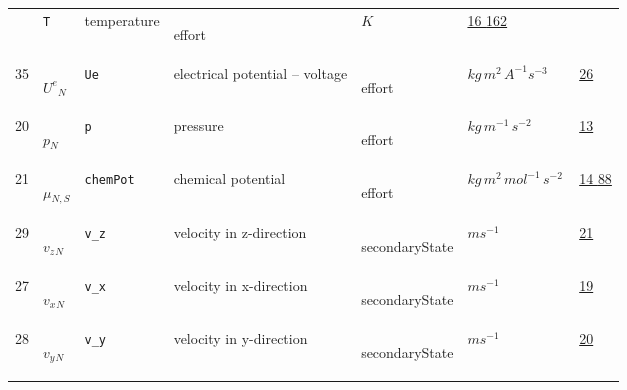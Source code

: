 \begin{longtable}{|p{1cm}|p{2.5cm}|p{4.5cm}|p{8cm}|p{3.0cm}|p{3cm}|p{1cm}|}
             & \verb|T|
             & temperature
             & \begin{lay}effort \end{lay}
             & $ K \, $
             &                 \hyperlink{"e:16"}{ 16 }
                                 \hyperlink{"e:162"}{ 162 }
                 \\
            35
             & \hypertarget{"v:35"}{ $ {{U^e}}{_{N}} $}
             & \verb|Ue|
             & electrical potential -- voltage
             & \begin{lay}effort \end{lay}
             & $ kg \,m^{2} \,A^{-1} s^{-3} \, $
             &                 \hyperlink{"e:26"}{ 26 }
                 \\
            20
             & \hypertarget{"v:20"}{ $ {p}{_{N}} $}
             & \verb|p|
             & pressure
             & \begin{lay}effort \end{lay}
             & $ kg \,m^{-1} \,s^{-2} \, $
             &                 \hyperlink{"e:13"}{ 13 }
                 \\
            21
             & \hypertarget{"v:21"}{ $ {{\mu}}{_{N, S}} $}
             & \verb|chemPot|
             & chemical potential
             & \begin{lay}effort \end{lay}
             & $ kg \,m^{2} \,mol^{-1} \,s^{-2} \, $
             &                 \hyperlink{"e:14"}{ 14 }
                                 \hyperlink{"e:88"}{ 88 }
                 \\
            29
             & \hypertarget{"v:29"}{ $ {{v_z}}{_{N}} $}
             & \verb|v_z|
             & velocity in z-direction
             & \begin{lay}secondaryState \end{lay}
             & $ m s^{-1} \, $
             &                 \hyperlink{"e:21"}{ 21 }
                 \\
            27
             & \hypertarget{"v:27"}{ $ {{v_x}}{_{N}} $}
             & \verb|v_x|
             & velocity in x-direction
             & \begin{lay}secondaryState \end{lay}
             & $ m s^{-1} \, $
             &                 \hyperlink{"e:19"}{ 19 }
                 \\
            28
             & \hypertarget{"v:28"}{ $ {{v_y}}{_{N}} $}
             & \verb|v_y|
             & velocity in y-direction
             & \begin{lay}secondaryState \end{lay}
             & $ m s^{-1} \, $
             &                 \hyperlink{"e:20"}{ 20 }
                 \\
    \end{longtable}